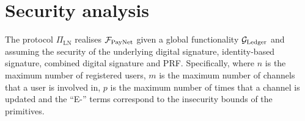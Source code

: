 \section{Security analysis}
\label{sec:ov-security-analysis}
  \begin{theorem}
    The protocol $\Pi_{\mathrm{LN}}$ realises $\mathcal{F}_{\mathrm{PayNet}}$ given a global
    functionality $\mathcal{G}_{\mathrm{Ledger}}$ and assuming the security of the underlying digital
    signature, identity-based signature, combined digital signature and PRF.
    Specifically,
    \label{theorem:simulation}
    where $n$ is the maximum number of registered users, $m$ is the maximum
    number of channels that a user is involved in, $p$ is the maximum number of
    times that a channel is updated and the ``E-'' terms correspond to the
    insecurity bounds of the primitives.
  \end{theorem}

